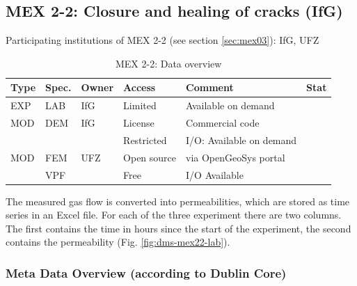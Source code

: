 \subsection{MEX 2-2: Closure and healing of cracks (IfG)}

Participating institutions of MEX 2-2 (see section \ref{sec:mex03}): IfG, UFZ

\begin{table}[ht!]
\caption{MEX 2-2: Data overview}
\label{tab:dms-mex22-overview}
\small
\begin{tabular}{l|l|l|l|L{4.7cm}|l}
\hline
{}
Type & Spec. & Owner & Access     & Comment                       & Stat \\ 
\hline
EXP  & LAB   & IfG   & Limited    & Available on demand           &  \\
\hline \hline
MOD  & DEM   & IfG   & License    & Commercial code               &  \\
     &       &       & Restricted & I/O: Available on demand      &  \\
\hline
MOD  & FEM   & UFZ   & Open source & via OpenGeoSys portal        &  \\
     & VPF   &       & Free       & I/O Available                 &  \\
%
\hline
\end{tabular}
\end{table}
\normalsize

The measured gas flow is converted into permeabilities, which are stored as time series in an Excel file. For each of the three experiment there are two columns. The first contains the time in hours since the start of the experiment, the second contains the permeability (Fig. \ref{fig:dms-mex22-lab}). 

\subsubsection*{Meta Data Overview (according to Dublin Core)}

